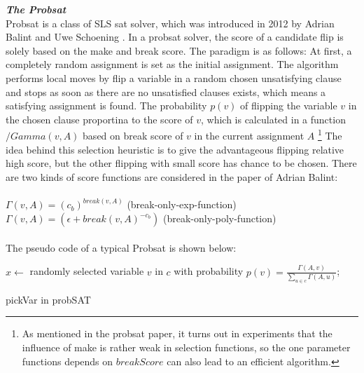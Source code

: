 \documentclass[12pt,a4paper,twoside]{scrartcl}
\numberwithin{equation}{section}
\begin{document}
\emph{\textbf{The Probsat}}\\
Probsat is a class of SLS sat solver, which was introduced in 2012 by Adrian Balint and Uwe Schoening \cite{balint2016engineering}. In a probsat solver, the score of a candidate flip is solely based on the make and break score. The paradigm is as follows: At first, a completely random assignment is set as the initial assignment. The algorithm performs local moves by flip a variable in a random chosen unsatisfying clause and stops as soon as there are no unsatisfied clauses exists, which means a satisfying assignment is found. The probability $p(v)$ of flipping the variable $v$ in the chosen clause proportina to the score of $v$, which is calculated in a function $/Gamma(v,A)$ based on break score of $v$ in the current assignment $A$ \footnote{As mentioned in the probsat paper, it turns out in experiments that the influence of make is rather weak in selection functions, so the one parameter functions depends on $breakScore$ can also lead to an efficient algorithm.} The idea behind this selection heuristic is to give the advantageous flipping relative high score, but the other flipping with small score has chance to be chosen.  There are two kinds of score functions are considered in the paper of Adrian Balint: \\
\\
$\Gamma(v,A) = (c_b)^{break(v,A)}$ (break-only-exp-function) \\
$\Gamma(v,A)=(\epsilon +break(v,A)^{-c_b})$  (break-only-poly-function)\\ 
\\
The pseudo code of a typical Probsat is shown below:\\
\begin{algorithm}[H]
  $x \leftarrow$ randomly selected  variable $v$ in $c$ with probability $p(v) =\frac{\Gamma(A,v)}{\sum_{u \in c}\Gamma(A,u)}$; 
 \caption{pickVar in probSAT}
\end{algorithm} 
\end{document}
